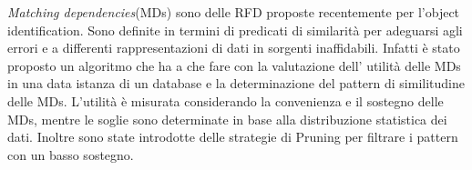\textit{Matching dependencies}(MDs) sono delle RFD proposte recentemente per l'object identification. Sono definite in termini di predicati di similarità per adeguarsi agli errori e a  differenti rappresentazioni di dati in sorgenti inaffidabili.
Infatti è stato proposto un algoritmo che ha a che fare con la valutazione dell' utilità delle MDs in una data istanza di un database e la determinazione del pattern di similitudine delle MDs.
L'utilità è misurata considerando la convenienza e il sostegno delle MDs, mentre le soglie sono determinate in base alla distribuzione statistica dei dati. Inoltre sono state introdotte delle strategie di Pruning per filtrare i pattern con un basso sostegno.
